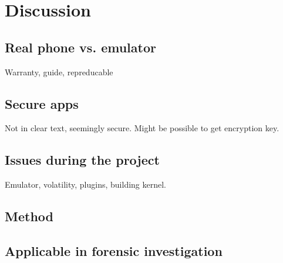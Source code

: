 \section{Discussion}
\subsection{Real phone vs. emulator}
Warranty, guide, repreducable
\subsection{Secure apps}
Not in clear text, seemingly secure. Might be possible to get encryption key.
\subsection{Issues during the project}
Emulator, volatility, plugins, building kernel.
\subsection{Method}
\subsection{Applicable in forensic investigation}